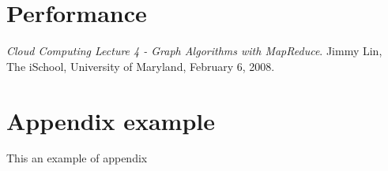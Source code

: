 \documentclass[english]{article}
\begin{document}
\section{Performance}

\newpage

\begin{thebibliography}{9}
 \textit{Cloud Computing Lecture 4 - Graph Algorithms with MapReduce}. Jimmy Lin, The iSchool, University of Maryland, February 6, 2008.
\end{thebibliography}
\newpage
\appendix
\section{Appendix example}
This an example of appendix
\end{document}
